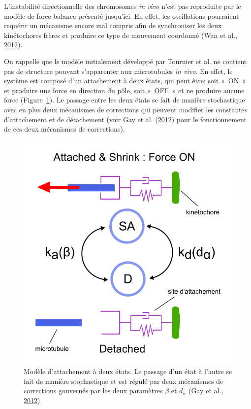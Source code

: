 \documentclass[12pt,a4paper,twoside,openright]{book}
\begin{document}
\label{sec:three-state}

L'instabilité directionnelle des chromosomes \emph{in vivo} n'est pas
reproduite par le modèle de force balance présenté jusqu'ici. En effet,
les oscillations pourraient requérir un mécanisme encore mal compris
afin de synchroniser les deux kinétochores frères et produire ce type de
mouvement coordonné (Wan et al., \protect\hyperlink{ref-Wan2012}{2012}).

On rappelle que le modèle initialement développé par Tournier et al. ne
contient pas de structure pouvant s'apparenter aux microtubules \emph{in
vivo}. En effet, le système est composé d'un attachement à deux états,
qui peut être; soit «~ON~» et produire une force en direction du pôle,
soit «~OFF~» et ne produire aucune force (Figure~\ref{fig:two_states}).
Le passage entre les deux états se fait de manière stochastique avec en
plus deux mécanismes de corrections qui peuvent modifier les constantes
d'attachement et de détachement (voir Gay et al.
(\protect\hyperlink{ref-Gay2012a}{2012}) pour le fonctionnement de ces
deux mécanismes de corrections).

\begin{figure}[htbp]
\centering
\includegraphics{figures/results/modelling/two_states.png}
\caption{\label{fig:two_states}Modèle d'attachement à deux états. Le
passage d'un état à l'autre se fait de manière stochastique et est
régulé par deux mécanismes de corrections gouvernés par les deux
paramètres \(\beta\) et \(d_\alpha\) (Gay et al.,
\protect\hyperlink{ref-Gay2012a}{2012}).}
\end{figure}
\end{document}
